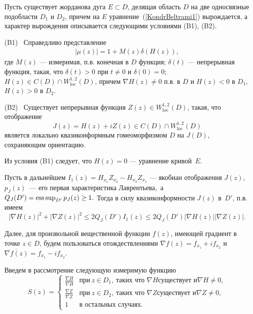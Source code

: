 Пусть существует жорданова дуга $E\subset D$, делящая область $D$ на две
односвязные подобласти $D_1$ и $D_2$, причем  на $E$ уравнение~(\ref{KondrBeltrami1}) вырождается, а
 характер вырождения описывается следующими условиями (B1), (B2).



\noindent(B1) \ Справедливо
представление
\begin{eqnarray}
|\mu(z)|=1+M(z)\delta (H(z)),\label{Kondrpredst1}\nonumber
\end{eqnarray}    где  $M(z)$ --- измеримая, п.в.  конечная в $D$ функция;
$\delta (t)$ --- непрерывная функция, такая, что
$\delta (t)>0$ при $t\ne 0$ и $\delta (0)=0$;
 $H(z)\in C(D)\cap
W^{1,2}_{\mathrm{loc}}(D)$, причем $\nabla
H(z)\ne 0$  п.в.  в $D$ и $H(z)<0$ в $D_1$, $H(z)>0$ в
$D_2$.



\noindent(B2) \ Существует непрерывная функция
$Z(z)\in W^{1,2}_{\mathrm{loc}}(D)$,
такая, что отображение
$$
J(z)=H(z)+i  Z(z)\in C(D)\cap
W^{1,2}_{\mathrm{loc}}(D)
$$
является локально квазиконформным
гомеоморфизмом $D$ на $J(D)$, сохраняющим ориентацию.

Из условия (B1) следует, что
$H(z)=0$  --- уравнение кривой~$E$.

Пусть в дальнейшем
$I_1(z)=
H_{x_1}Z_{x_2}-H_{x_2}Z_{x_1}$
--- якобиан  отображения $J(z)$, $p_{J}(z)$~--- его первая характеристика Лаврентьева,~а
$Q_J(D')=\mathop{\mathrm{ess\, sup}}_{D'}p_{J}(z)\geq1.$ Тогда в силу квазиконформности $J(z)$ в~$D'$, п.в. имеем
\begin{equation}\label{KondrNer3}
    |\nabla H(z)|^2+|\nabla
    Z(z)|^2\leq2Q_J(D')I_1(z)\leq2Q_J(D')|\nabla H(z)||\nabla Z(z)|.
\end{equation}


Далее, для произвольной вещественной функции
$f(z)$, имеющей градиент в точке $z\in D$,
будем пользоваться отождествлениями
$\nabla f(z)=f_{x_1}+i f_{x_2}$ и
$\overline{\nabla f(z)}=f_{x_1}-i f_{x_2}.$

Введем в рассмотрение следующую измеримую функцию
$$
S(z)=\left\lbrace\begin{array}{cl}
  \frac{\nabla H}{\overline{\nabla H}} & \mbox{при} \ z\in D_1, \ \mbox{таких что } \nabla H \mbox{существует и} \nabla H\ne0,\\[15pt]
  \frac{\nabla Z}{\overline{\nabla Z}}& \mbox{при} \  z\in D_2, \ \mbox{таких что } \nabla Z \mbox{существует и} \nabla Z\ne0,\\[15pt]
  1& \mbox{в остальных случаях.}
\end{array}\right.
$$

